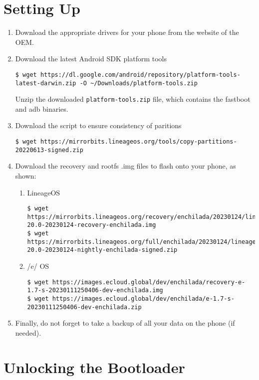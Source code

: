 \documentclass[journal,12pt,twocolumn]{IEEEtran}
\renewcommand\thesection{\arabic{section}}
\begin{document}
\section{Setting Up}

\begin{enumerate}[label=\thesection.\arabic*
,ref=\thesection.\theenumi]
\item Download the appropriate drivers for your phone from the website of the
OEM.
\item Download the latest Android SDK platform tools
\begin{lstlisting}
$ wget https://dl.google.com/android/repository/platform-tools-latest-darwin.zip -O ~/Downloads/platform-tools.zip
\end{lstlisting}
Unzip the downloaded \texttt{platform-tools.zip} file, which contains the 
fastboot and adb binaries.
\item Download the script to ensure consistency of paritions
\begin{lstlisting}
$ wget https://mirrorbits.lineageos.org/tools/copy-partitions-20220613-signed.zip
\end{lstlisting}
\item Download the recovery and rootfs .img files to flash onto your phone,
as shown:
\begin{enumerate}
    \item LineageOS
    \begin{lstlisting}
$ wget https://mirrorbits.lineageos.org/recovery/enchilada/20230124/lineage-20.0-20230124-recovery-enchilada.img
$ wget https://mirrorbits.lineageos.org/full/enchilada/20230124/lineage-20.0-20230124-nightly-enchilada-signed.zip
    \end{lstlisting}
    \item /e/ OS
    \begin{lstlisting}
$ wget https://images.ecloud.global/dev/enchilada/recovery-e-1.7-s-20230111250406-dev-enchilada.img
$ wget https://images.ecloud.global/dev/enchilada/e-1.7-s-20230111250406-dev-enchilada.zip
    \end{lstlisting}
\end{enumerate}
\item Finally, do not forget to take a backup of all your data on the phone 
(if needed).
\end{enumerate}

\section{Unlocking the Bootloader}
\end{document}
